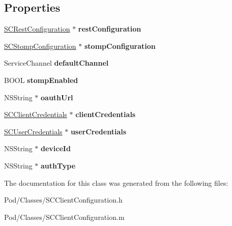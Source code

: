 \subsection*{Properties}
\begin{DoxyCompactItemize}
\item 
\hyperlink{interface_s_c_rest_configuration}{S\+C\+Rest\+Configuration} $\ast$ {\bfseries rest\+Configuration}\hypertarget{interface_s_c_client_configuration_a15bcaa102cb5b4fd93e5451b89e4d47f}{}\label{interface_s_c_client_configuration_a15bcaa102cb5b4fd93e5451b89e4d47f}

\item 
\hyperlink{interface_s_c_stomp_configuration}{S\+C\+Stomp\+Configuration} $\ast$ {\bfseries stomp\+Configuration}\hypertarget{interface_s_c_client_configuration_acedbd6a84538b3035f0435ff9cb94d55}{}\label{interface_s_c_client_configuration_acedbd6a84538b3035f0435ff9cb94d55}

\item 
Service\+Channel {\bfseries default\+Channel}\hypertarget{interface_s_c_client_configuration_a08bf2a80b508b428f9e5ba52fedef15a}{}\label{interface_s_c_client_configuration_a08bf2a80b508b428f9e5ba52fedef15a}

\item 
B\+O\+OL {\bfseries stomp\+Enabled}\hypertarget{interface_s_c_client_configuration_ab00707d77e4aa7aef15a308f1ec1b966}{}\label{interface_s_c_client_configuration_ab00707d77e4aa7aef15a308f1ec1b966}

\item 
N\+S\+String $\ast$ {\bfseries oauth\+Url}\hypertarget{interface_s_c_client_configuration_a92e362bf8502955c00e19ae14a47c82a}{}\label{interface_s_c_client_configuration_a92e362bf8502955c00e19ae14a47c82a}

\item 
\hyperlink{interface_s_c_client_credentials}{S\+C\+Client\+Credentials} $\ast$ {\bfseries client\+Credentials}\hypertarget{interface_s_c_client_configuration_a80522025a587d2cae89a50c0023e5ead}{}\label{interface_s_c_client_configuration_a80522025a587d2cae89a50c0023e5ead}

\item 
\hyperlink{interface_s_c_user_credentials}{S\+C\+User\+Credentials} $\ast$ {\bfseries user\+Credentials}\hypertarget{interface_s_c_client_configuration_a1ead3f0bdf9be638e9b1b7413d9fb4bd}{}\label{interface_s_c_client_configuration_a1ead3f0bdf9be638e9b1b7413d9fb4bd}

\item 
N\+S\+String $\ast$ {\bfseries device\+Id}\hypertarget{interface_s_c_client_configuration_ae3c2fda4c0116394a6e44d35228ab271}{}\label{interface_s_c_client_configuration_ae3c2fda4c0116394a6e44d35228ab271}

\item 
N\+S\+String $\ast$ {\bfseries auth\+Type}\hypertarget{interface_s_c_client_configuration_a082526f39045dbec91e831a72b6599c4}{}\label{interface_s_c_client_configuration_a082526f39045dbec91e831a72b6599c4}

\end{DoxyCompactItemize}


The documentation for this class was generated from the following files\+:\begin{DoxyCompactItemize}
\item 
Pod/\+Classes/S\+C\+Client\+Configuration.\+h\item 
Pod/\+Classes/S\+C\+Client\+Configuration.\+m\end{DoxyCompactItemize}

